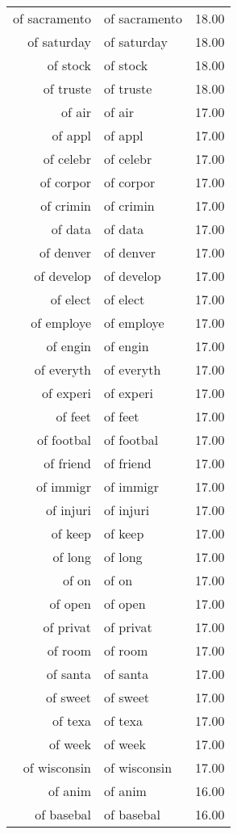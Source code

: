 \begin{table}[ht]
\begin{tabular}{rlr}
  of sacramento & of sacramento & 18.00 \\ 
  of saturday & of saturday & 18.00 \\ 
  of stock & of stock & 18.00 \\ 
  of truste & of truste & 18.00 \\ 
  of air & of air & 17.00 \\ 
  of appl & of appl & 17.00 \\ 
  of celebr & of celebr & 17.00 \\ 
  of corpor & of corpor & 17.00 \\ 
  of crimin & of crimin & 17.00 \\ 
  of data & of data & 17.00 \\ 
  of denver & of denver & 17.00 \\ 
  of develop & of develop & 17.00 \\ 
  of elect & of elect & 17.00 \\ 
  of employe & of employe & 17.00 \\ 
  of engin & of engin & 17.00 \\ 
  of everyth & of everyth & 17.00 \\ 
  of experi & of experi & 17.00 \\ 
  of feet & of feet & 17.00 \\ 
  of footbal & of footbal & 17.00 \\ 
  of friend & of friend & 17.00 \\ 
  of immigr & of immigr & 17.00 \\ 
  of injuri & of injuri & 17.00 \\ 
  of keep & of keep & 17.00 \\ 
  of long & of long & 17.00 \\ 
  of on & of on & 17.00 \\ 
  of open & of open & 17.00 \\ 
  of privat & of privat & 17.00 \\ 
  of room & of room & 17.00 \\ 
  of santa & of santa & 17.00 \\ 
  of sweet & of sweet & 17.00 \\ 
  of texa & of texa & 17.00 \\ 
  of week & of week & 17.00 \\ 
  of wisconsin & of wisconsin & 17.00 \\ 
  of anim & of anim & 16.00 \\ 
  of basebal & of basebal & 16.00 \\ 

\end{tabular}
\end{table}
